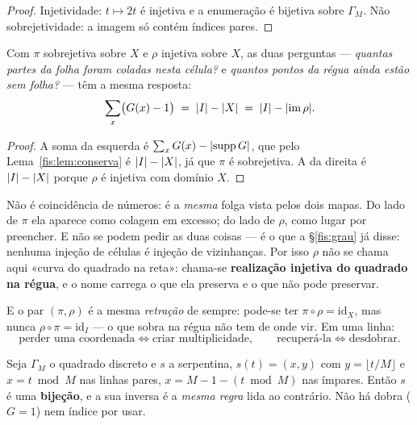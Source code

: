 \documentclass[livro.tex]{subfiles}
\begin{document}
\begin{proof}
Injetividade: $t\mapsto2t$ é injetiva e a enumeração é bijetiva sobre
$\Gamma_M$. Não sobrejetividade: a imagem só contém índices pares.
\end{proof}

\begin{corolario}\label{fis:cor:folga}
Com $\pi$ sobrejetiva sobre $X$ e $\rho$ injetiva sobre $X$, as duas perguntas
--- \emph{quantas partes da folha foram coladas nesta célula?} e \emph{quantos
pontos da régua ainda estão sem folha?} --- têm a mesma resposta:
\[
\sum_{x}\bigl(G(x)-1\bigr)\;=\;\lvert I\rvert-\lvert X\rvert\;=\;\lvert I\rvert-\lvert \operatorname{im}\rho\rvert .
\]
\end{corolario}

\begin{proof}
A soma da esquerda é $\sum_x G(x)-\lvert \operatorname{supp}G\rvert$, que pelo
Lema~\ref{fis:lem:conserva} é $\lvert I\rvert-\lvert X\rvert$, já que $\pi$ é sobrejetiva. A da
direita é $\lvert I\rvert-\lvert X\rvert$ porque $\rho$ é injetiva com domínio $X$.
\end{proof}

\medskip\noindent Não é coincidência de números: é a \emph{mesma} folga vista
pelos dois mapas. Do lado de $\pi$ ela aparece como colagem em excesso; do lado
de $\rho$, como lugar por preencher. E não se podem pedir as duas coisas --- é o
que a §\ref{fis:grau} já disse: nenhuma injeção de células é injeção de
vizinhanças. Por isso $\rho$ não se chama aqui «curva do quadrado na reta»:
chama-se \textbf{realização injetiva do quadrado na régua}, e o nome carrega o que
ela preserva e o que não pode preservar.

\medskip\noindent E o par $(\pi,\rho)$ é a mesma \emph{retração} de sempre:
pode-se ter $\pi\circ\rho=\mathrm{id}_X$, mas nunca
$\rho\circ\pi=\mathrm{id}_I$ --- o que sobra na régua não tem de onde vir. Em uma
linha:
\[
\boxed{\ \text{perder uma coordenada}\iff\text{criar multiplicidade},\qquad
\text{recuperá-la}\iff\text{desdobrar}.\ }
\]

\begin{teorema}\label{fis:thm:bijeccao}
Seja $\Gamma_M$ o quadrado discreto e $s$ a serpentina, $s(t)=(x,y)$ com
$y=\lfloor t/M\rfloor$ e $x=t\bmod M$ nas linhas pares, $x=M-1-(t\bmod M)$ nas
ímpares. Então $s$ é uma \textbf{bijeção}, e a sua inversa é a \emph{mesma regra}
lida ao contrário. Não há dobra ($G=1$) nem índice por usar.
\end{teorema}
\end{document}
